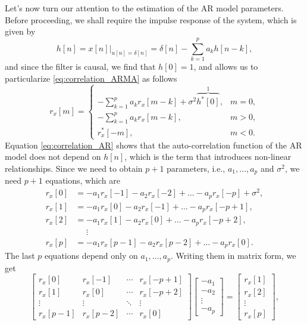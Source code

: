 Let's now turn our attention to the estimation of the AR model parameters. Before proceeding, we shall require the impulse response of the system, which is given by
\begin{equation*}
h[n] = \left.x[n]\right|_{u[n] = \delta[n]} = \delta[n] - \sum_{k = 1}^{p} a_k h[n -k],
\end{equation*}
and since the filter is causal, we find that $h[0] = 1$, and allows us to particularize \eqref{eq:correlation_ARMA} as follows
\begin{equation}
\label{eq:correlation_AR}
r_{x}[m] = \begin{cases}
\displaystyle - \sum_{k = 1}^{p} a_k r_{x}[m-k] + \sigma^2  \overbrace{h^{\ast}[0]}^1, & m = 0, \\ 
\displaystyle  - \sum_{k = 1}^{p} a_k r_{x}[m-k], & m > 0, \\
r_{x}^{\ast}[-m], & m < 0.
\end{cases}
\end{equation}
Equation \eqref{eq:correlation_AR} shows that the auto-correlation function of the AR model does not depend on $h[n]$, which is the term that introduces non-linear relationships. Since we need to obtain $p+1$ parameters, i.e., $a_1, \ldots, a_p$ and $\sigma^2$, we need $p+1$ equations, which are
\begin{align*}
r_x[0] &= -a_1 r_x[-1] - a_2 r_x[-2] + \ldots -a_p r_x[-p] + \sigma^2, \\
r_x[1] &= -a_1 r_x[0] - a_2 r_x[-1] + \ldots -a_p r_x[-p+1], \\
r_x[2] &= -a_1 r_x[1] - a_2 r_x[0] + \ldots -a_p r_x[-p+2], \\
	&\phantom{=} \vdots \\
r_x[p] &= -a_1 r_x[p-1] - a_2 r_x[p-2] + \ldots -a_p r_x[0].
\end{align*}
The last $p$ equations depend only on $a_1, \ldots, a_p$. Writing them in matrix form, we get
\begin{equation*}
\begin{bmatrix}
r_x[0] & r_x[-1] & \cdots & r_x[-p+1] \\
r_x[1] & r_x[0] & \cdots & r_x[-p+2] \\
\vdots & \vdots & \ddots & \vdots \\
r_x[p-1] & r_x[p-2] & \cdots & r_x[0] 
\end{bmatrix}
\begin{bmatrix}
-a_1 \\ -a_2 \\ \vdots \\ -a_p
\end{bmatrix} = 
\begin{bmatrix}
r_x[1] \\ r_x[2] \\ \vdots \\ r_x[p]
\end{bmatrix},
\end{equation*}
